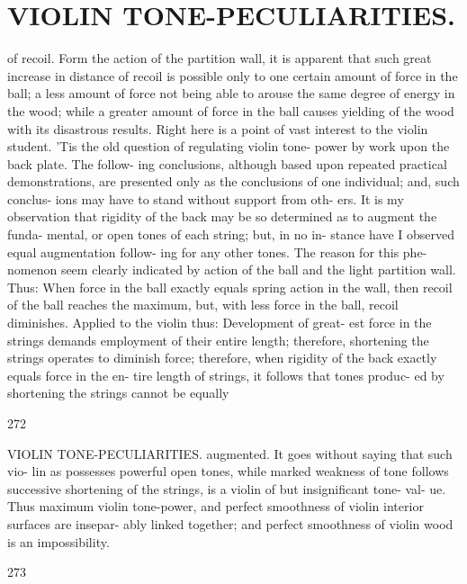 \documentclass{article}
\begin{document}
\section*{VIOLIN TONE-PECULIARITIES.}
of recoil. Form the action of the partition wall, it is apparent that such great increase in distance of recoil is possible only to one certain amount of force in the ball; a less amount of force not being able to arouse the same degree of energy in the wood; while a greater amount of force in the ball causes yielding of the wood with its disastrous results. Right here is a point of vast interest to the violin student. 'Tis the old question of regulating violin tone- power by work upon the back plate. The follow- ing conclusions, although based upon repeated practical demonstrations, are presented only as the conclusions of one individual; and, such conclus- ions may have to stand without support from oth- ers. It is my observation that rigidity of the back may be so determined as to augment the funda- mental, or open tones of each string; but, in no in- stance have I observed equal augmentation follow- ing for any other tones. The reason for this phe- nomenon seem clearly indicated by action of the ball and the light partition wall. Thus: When force in the ball exactly equals spring action in the wall, then recoil of the ball reaches the maximum, but, with less force in the ball, recoil diminishes. Applied to the violin thus: Development of great- est force in the strings demands employment of their entire length; therefore, shortening the strings operates to diminish force; therefore, when rigidity of the back exactly equals force in the en- tire length of strings, it follows that tones produc- ed by shortening the strings cannot be equally

272

VIOLIN TONE-PECULIARITIES. augmented. It goes without saying that such vio- lin as possesses powerful open tones, while marked weakness of tone follows successive shortening of the strings, is a violin of but insignificant tone- val- ue. Thus maximum violin tone-power, and perfect smoothness of violin interior surfaces are insepar- ably linked together; and perfect smoothness of violin wood is an impossibility.

273
\end{document}
